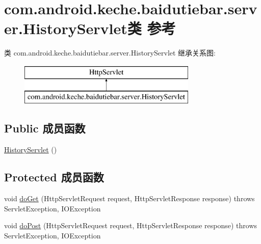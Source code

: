 \hypertarget{classcom_1_1android_1_1keche_1_1baidutiebar_1_1server_1_1_history_servlet}{}\section{com.\+android.\+keche.\+baidutiebar.\+server.\+History\+Servlet类 参考}
\label{classcom_1_1android_1_1keche_1_1baidutiebar_1_1server_1_1_history_servlet}
类 com.\+android.\+keche.\+baidutiebar.\+server.\+History\+Servlet 继承关系图\+:\begin{figure}[H]
\begin{center}
\leavevmode
\includegraphics[height=2.000000cm]{classcom_1_1android_1_1keche_1_1baidutiebar_1_1server_1_1_history_servlet}
\end{center}
\end{figure}
\subsection*{Public 成员函数}
\begin{DoxyCompactItemize}
\item 
\mbox{\hyperlink{classcom_1_1android_1_1keche_1_1baidutiebar_1_1server_1_1_history_servlet_a1ad77d9d8e390da15db2f9fc756d2880}{History\+Servlet}} ()
\end{DoxyCompactItemize}
\subsection*{Protected 成员函数}
\begin{DoxyCompactItemize}
\item 
void \mbox{\hyperlink{classcom_1_1android_1_1keche_1_1baidutiebar_1_1server_1_1_history_servlet_a27515d01f2660e911b8d176bee1541ea}{do\+Get}} (Http\+Servlet\+Request request, Http\+Servlet\+Response response)  throws Servlet\+Exception, I\+O\+Exception 
\item 
void \mbox{\hyperlink{classcom_1_1android_1_1keche_1_1baidutiebar_1_1server_1_1_history_servlet_aa5f065d950c5794b099a4106592862b5}{do\+Post}} (Http\+Servlet\+Request request, Http\+Servlet\+Response response)  throws Servlet\+Exception, I\+O\+Exception 
\end{DoxyCompactItemize}



